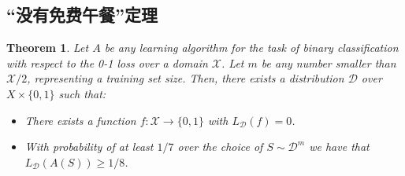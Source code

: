 \documentclass{article}
\newtheorem{theorem}{Theorem}
\begin{document}
\subsection{“没有免费午餐”定理}

	\begin{theorem}
	Let $A$ be any learning algorithm for the task of binary classification with respect to the 0-1 loss over a domain $\mathcal{X}$. Let $m$ be any number smaller than $\mathcal{X}/2$, representing a training set size. Then, there exists a distribution $\mathcal{D}$ over ${X}\times\{0,1\}$ such that:
	
	\begin{itemize}
	\item There exists a function $f:\mathcal{X}\rightarrow\{0,1\}$ with $L_\mathcal{D}(f)=0$.
	\item With probability of at least $1/7$ over the choice of $S\sim\mathcal{D}^m$ we have that $L_\mathcal{D}(A(S))\geq 1/8$.
	\end{itemize} 
	\end{theorem}
	
\end{document}
